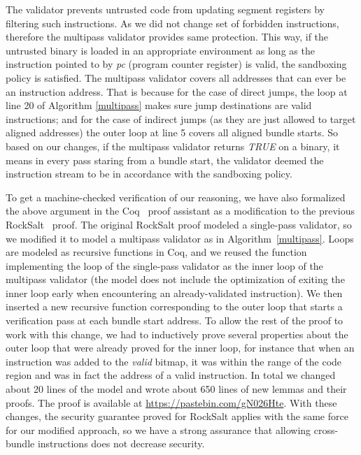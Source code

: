 \documentclass[conference]{IEEEtran}
\begin{document}
The validator prevents untrusted code from updating segment registers by filtering such instructions. As we did not change set of forbidden instructions, therefore the multipass validator provides same protection. This way, if the untrusted binary is loaded in an appropriate environment as long as the instruction pointed to by \textit{pc} (program counter register) is valid, the sandboxing policy is satisfied. The multipass validator covers all addresses that can ever be an instruction address. That is because for the case of direct jumps, the loop at line 20 of Algorithm \ref{multipass} makes sure jump destinations are valid instructions; and for the case of indirect jumps (as they are just allowed to target aligned addresses) the outer loop at line 5 covers all aligned bundle starts. 
So based on our changes, if the multipass validator returns \textit{TRUE} on a binary, it means in every pass staring from a bundle start, the validator deemed the instruction stream to be in accordance with the sandboxing policy. 

To get a machine-checked verification of our reasoning, we have also
formalized the above argument in the Coq~\cite{Coq} proof assistant as
a modification to the previous RockSalt~\cite{morrisettRocksalt}
proof.
%
The original RockSalt proof modeled a single-pass validator, so we
modified it to model a multipass validator as in
Algorithm~\ref{multipass}.
%
Loops are modeled as recursive functions in Coq, and we
reused the function implementing the loop of the single-pass validator
as the inner loop of the multipass validator (the model does not
include the optimization of exiting the inner loop early when
encountering an already-validated instruction).
%
We then inserted a new recursive function corresponding to the outer
loop that starts a verification pass at each bundle start address.
%
To allow the rest of the proof to work with this change, we had to
inductively prove several properties about the outer loop that were
already proved for the inner loop, for instance that when an
instruction was added to the {\em valid} bitmap, it was within the
range of the code region and was in fact the address of a valid
instruction.
%
In total we changed about 20 lines of the model and wrote about 650
lines of new lemmas and their proofs.
%
The proof is available at \url{https://pastebin.com/gN026Hte}.
%
With these changes, the security guarantee proved for RockSalt applies
with the same force for our modified approach, so we have a strong
assurance that allowing cross-bundle instructions does not decrease
security.
\end{document}
